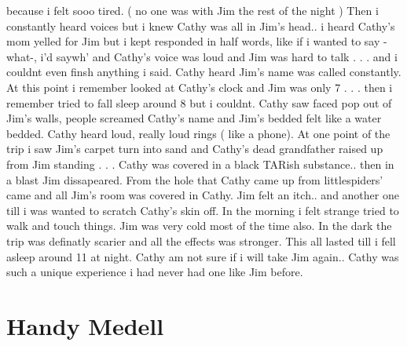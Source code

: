 \documentclass[12pt]{book}
\begin{document}
because i felt sooo tired. ( no one was with Jim the rest of the night ) Then i constantly heard voices but i knew Cathy was all in Jim's head.. i heard Cathy's mom yelled for Jim but i kept responded in half words, like if i wanted to say -what-, i'd saywh' and Cathy's voice was loud and Jim was hard to talk . . .  and i couldnt even finsh anything i said. Cathy heard Jim's name was called constantly. At this point i remember looked at Cathy's clock and Jim was only 7 . . .  then i remember tried to fall sleep around 8 but i couldnt. Cathy saw faced pop out of Jim's walls, people screamed Cathy's name and Jim's bedded felt like a water bedded. Cathy heard loud, really loud rings ( like a phone). At one point of the trip i saw Jim's carpet turn into sand and Cathy's dead grandfather raised up from Jim standing . . .  Cathy was covered in a black TARish substance.. then in a blast Jim dissapeared. From the hole that Cathy came up from littlespiders' came and all Jim's room was covered in Cathy. Jim felt an itch.. and another one till i was wanted to scratch Cathy's skin off. In the morning i felt strange tried to walk and touch things. Jim was very cold most of the time also. In the dark the trip was definatly scarier and all the effects was stronger. This all lasted till i fell asleep around 11 at night. Cathy am not sure if i will take Jim again.. Cathy was such a unique experience i had never had one like Jim before.



\chapter{Handy Medell}
\end{document}
